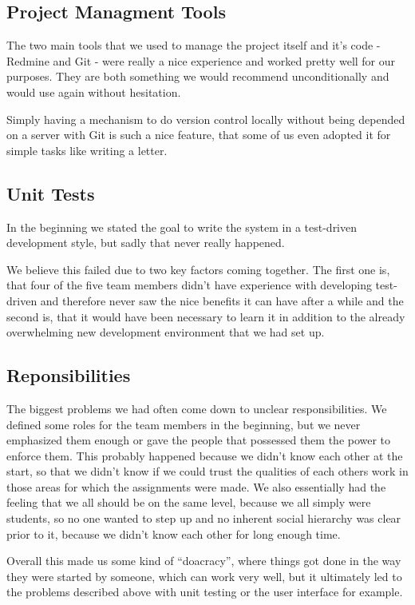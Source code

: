 \subsection{Project Managment Tools}

The two main tools that we used to manage the project itself and it's code - Redmine and Git - were really a nice experience and worked pretty well for our purposes. They are both something we would recommend unconditionally and would use again without hesitation. 

Simply having a mechanism to do version control locally without being depended on a server with Git is such a nice feature, that some of us even adopted it for simple tasks like writing a letter.

\subsection{Unit Tests}

In the beginning we stated the goal to write the system in a test-driven development style, but sadly that never really happened. 

We believe this failed due to two key factors coming together. The first one is, that four of the five team members didn't have experience with developing test-driven and therefore never saw the nice benefits it can have after a while and the second is, that it would have been necessary to learn it in addition to the already overwhelming new development environment that we had set up.

\subsection{Reponsibilities}

The biggest problems we had often come down to unclear responsibilities. We defined some roles for the team members in the beginning, but we never emphasized them enough or gave the people that possessed them the power to enforce them. This probably happened because we didn't know each other at the start, so that we didn't know if we could trust the qualities of each others work in those areas for which the assignments were made. We also essentially had the feeling that we all should be on the same level, because we all simply were students, so no one wanted to step up and no inherent social hierarchy was clear prior to it, because we didn't know each other for long enough time.

Overall this made us some kind of \enquote{doacracy}, where things got done in the way they were started by someone, which can work very well, but it ultimately led to the problems described above with unit testing or the user interface for example.

